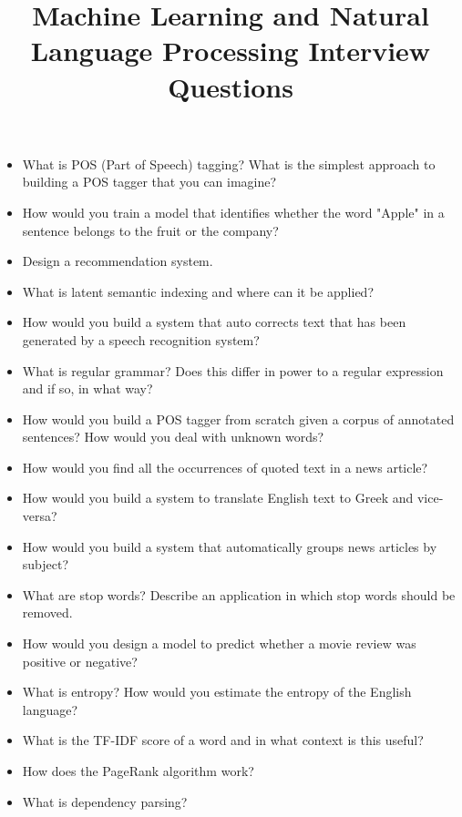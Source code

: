 \documentclass{article}
\begin{document}
\title{Machine Learning and Natural Language Processing Interview Questions}
\maketitle
\begin{itemize}
	\item What is POS (Part of Speech) tagging? What is the simplest approach to building a POS tagger that you can imagine?
	\item How would you train a model that identifies whether the word "Apple" in a sentence belongs to the fruit or the company?
	\item Design a recommendation system.
	\item What is latent semantic indexing and where can it be applied?
	\item How would you build a system that auto corrects text that has been generated by a speech recognition system?
	\item What is regular grammar? Does this differ in power to a regular expression and if so, in what way?
	\item How would you build a POS tagger from scratch given a corpus of annotated sentences? How would you deal with unknown words?
	\item How would you find all the occurrences of quoted text in a news article? 
	\item How would you build a system to translate English text to Greek and vice-versa?
	\item How would you build a system that automatically groups news articles by subject?
	\item What are stop words? Describe an application in which stop words should be removed.
	\item How would you design a model to predict whether a movie review was positive or negative?
	\item What is entropy? How would you estimate the entropy of the English language?
	\item What is the TF-IDF score of a word and in what context is this useful?
	\item How does the PageRank algorithm work?
	\item What is dependency parsing?
\end{itemize}
\end{document}

